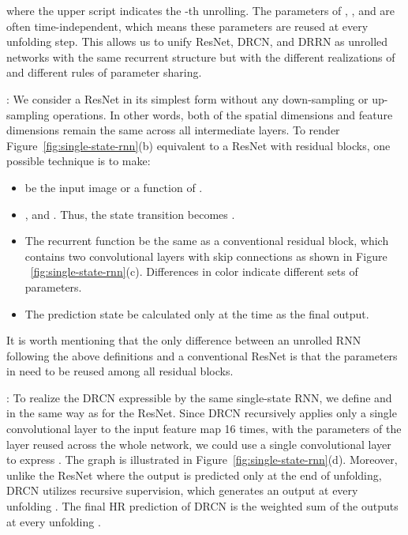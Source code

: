 \documentclass[10pt,twocolumn,letterpaper]{article}
\begin{document}
where the upper script  indicates the -th unrolling.  The parameters of , , and  are often time-independent, which means these parameters are reused at every unfolding step.  This allows us to unify ResNet, DRCN, and DRRN as unrolled networks with the same recurrent structure but with the different realizations of  and different rules of parameter sharing. 

\vspace*{0.05in}
:  We consider a ResNet in its simplest form without any down-sampling or up-sampling operations.  In other words, both of the spatial dimensions and feature dimensions remain the same across all intermediate layers.  To render Figure~\ref{fig:single-state-rnn}(b) equivalent to a ResNet with  residual blocks, one possible technique is to make:
\begin{itemize}
\item  be the input image  or a function of .
\item , and .  Thus, the state transition becomes .
\item The recurrent function  be the same as a conventional residual block, which contains two convolutional layers with skip connections as shown in Figure 
~\ref{fig:single-state-rnn}(c). Differences in color indicate different sets of parameters. 
\item The prediction state  be calculated only at the time  as the final output.
\end{itemize}
It is worth mentioning that the only difference between an unrolled RNN following the above definitions and a conventional ResNet is that the parameters in  need to be reused among all residual blocks.  



\vspace*{0.05in}
: To realize the DRCN expressible by the same single-state RNN, we define  and  in the same way as for the ResNet.  Since DRCN recursively applies only a single convolutional layer to the input feature map 16 times, with the parameters of the layer reused across the whole network, we could use a single convolutional layer to express .  The graph is illustrated in Figure~\ref{fig:single-state-rnn}(d).  Moreover, unlike the ResNet where the output is predicted only at the end of unfolding, DRCN utilizes recursive supervision, which generates an output  at every unfolding .  
The final HR prediction of DRCN is the weighted sum of the outputs at every unfolding .
\end{document}
